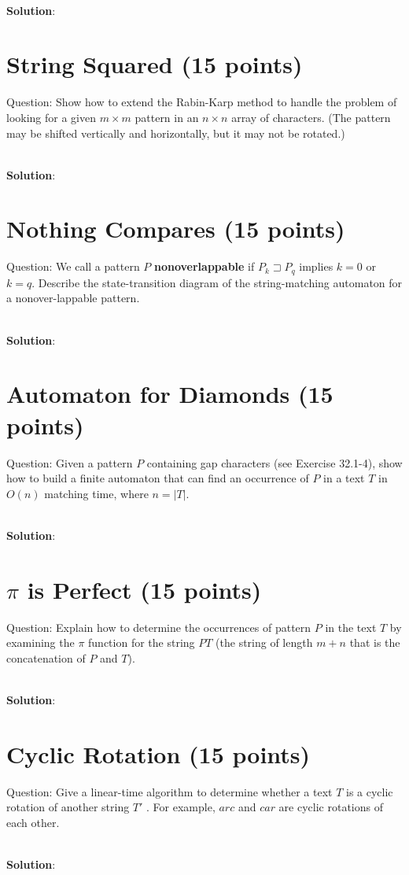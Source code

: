 \documentclass{article}
\begin{document}
~\\
\textbf{Solution}:\newline
\indent 


\section{String Squared (15 points)}
Question: Show how to extend the Rabin-Karp method to handle the problem of looking for a given $m \times m$ pattern in an $n \times n$ array of characters. (The pattern may be shifted vertically and horizontally, but it may not be rotated.)

~\\
\textbf{Solution}:\newline
\indent 


\section{Nothing Compares (15 points)}
Question: We call a pattern $P$ \textbf{nonoverlappable} if $P_{k} \sqsupset P_{q}$ implies $k = 0$ or $k = q$. Describe the state-transition diagram of the string-matching automaton for a nonover-lappable pattern.

~\\
\textbf{Solution}:\newline
\indent 
\section{Automaton for Diamonds (15 points)}
Question: Given a pattern $P$ containing gap characters (see Exercise 32.1-4), show how to build a finite automaton that can find an occurrence of $P$ in a text $T$ in $O(n)$ matching time, where $n = |T|$.

~\\
\textbf{Solution}:\newline
\indent 

\section{$\pi$ is Perfect (15 points)}
Question: Explain how to determine the occurrences of pattern $P$ in the text $T$ by examining the $\pi$ function for the string $PT$ (the string of length $m+n$ that is the concatenation of $P$ and $T$).

~\\
\textbf{Solution}:\newline
\indent

\section{Cyclic Rotation (15 points)}
Question: Give a linear-time algorithm to determine whether a text $T$ is a cyclic rotation of another string $T'$ . For example, $arc$ and $car$ are cyclic rotations of each other.

~\\
\textbf{Solution}:\newline
\indent
\end{document}

